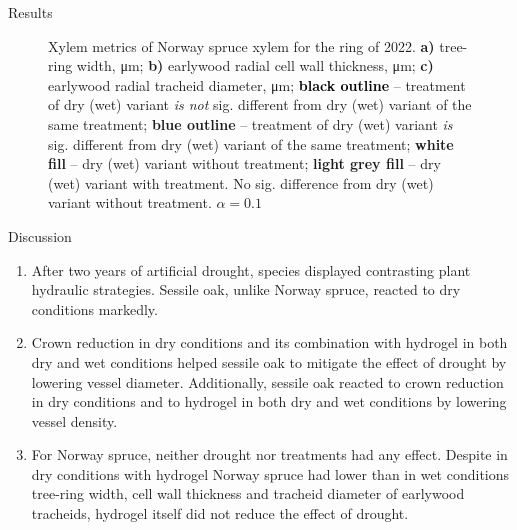 \documentclass[final]{beamer}
\newlength{\colwidth}
\begin{document}
\begin{frame}[t]
\begin{columns}[t]
\begin{column}{\colwidth}
\begin{block}{Results}
\begin{figure}
    
    \caption{
        Xylem metrics of Norway spruce xylem for the ring of 2022.
        \textbf{a)} tree-ring width, \si{\micro\meter};
        \textbf{b)} earlywood radial cell wall thickness, \si{\micro\meter};
        \textbf{c)} earlywood radial tracheid diameter, \si{\micro\meter};
        \textbf{\textcolor{black}{black outline}} -- treatment of dry (wet) variant \emph{is not} sig. different from dry (wet) variant of the same treatment;
        \textbf{\textcolor[RGB]{31,120,180}{blue outline}} -- treatment of dry (wet) variant \emph{is} sig. different from dry (wet) variant of the same treatment;
        \textbf{\colorbox{white}{white fill}} -- dry (wet) variant without treatment;
        \textbf{\colorbox{gray!10}{light grey fill}} -- dry (wet) variant with treatment. No sig. difference from dry (wet) variant without treatment.
        $\alpha = 0.1$
    }
    \label{fig:spruce_box}
\end{figure}
\end{block}

\begin{block}{Discussion}
\setlength{\columnsep}{20pt}
\begin{multicols}{2}
    \begin{enumerate}
        \item After two years of artificial drought, species displayed contrasting plant hydraulic strategies. Sessile oak, unlike Norway spruce, reacted to dry conditions markedly.
        \item Crown reduction in dry conditions and its combination with hydrogel in both dry and wet conditions helped sessile oak to mitigate the effect of drought by lowering vessel diameter. Additionally, sessile oak reacted to crown reduction in dry conditions and to hydrogel in both dry and wet conditions by lowering vessel density.
        \item For Norway spruce, neither drought nor treatments had any effect. Despite in dry conditions with hydrogel Norway spruce had lower than in wet conditions tree-ring width, cell wall thickness and tracheid diameter of earlywood tracheids, hydrogel itself did not reduce the effect of drought.
    \end{enumerate}
\end{multicols}
\end{block}


\end{column}
\end{columns}
\end{frame}
\end{document}
